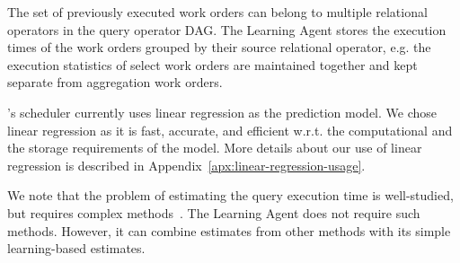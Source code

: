 The set of previously executed work orders can belong to multiple relational operators in the query operator DAG. 
The Learning Agent stores the execution times of the work orders grouped by their source relational operator, e.g. the execution statistics of select work orders are maintained together and kept separate from aggregation work orders. 

\sys{}'s scheduler currently uses linear regression as the prediction model.
We chose linear regression as it is fast, accurate, and efficient w.r.t. the computational and the storage requirements of the model. 
More details about our use of linear regression is described in Appendix~\ref{apx:linear-regression-usage}.

We note that the problem of estimating the query execution time is well-studied, but requires complex methods~\cite{duggan2011performance, wu2013towards, li2012gslpi, 
chaudhuri2004estimating}. 
The Learning Agent does not require such methods. 
However, it can combine estimates from other methods with its simple learning-based estimates.
